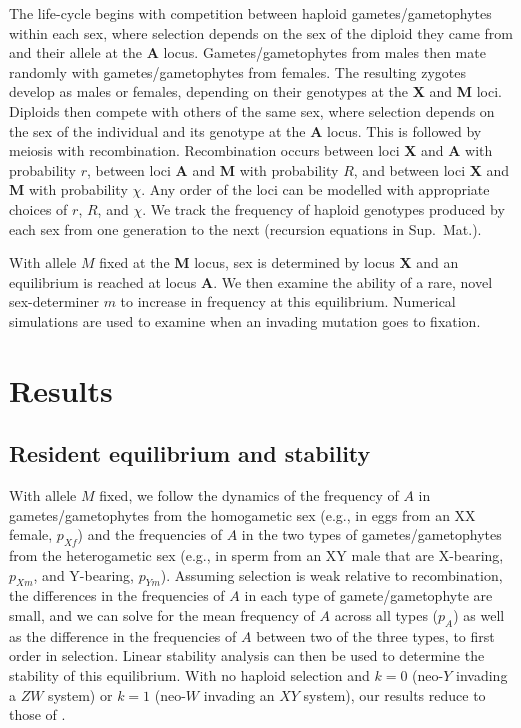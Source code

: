 \documentclass[12pt]{article}
\begin{document}
The life-cycle begins with competition between haploid gametes/gametophytes within each sex, where selection depends on the sex of the diploid they came from and their allele at the \textbf{A} locus.
Gametes/gametophytes from males then mate randomly with gametes/gametophytes from females.
The resulting zygotes develop as males or females, depending on their genotypes at the \textbf{X} and \textbf{M} loci.
Diploids then compete with others of the same sex, where selection depends on the sex of the individual and its genotype at the \textbf{A} locus.
This is followed by meiosis with recombination. 
Recombination occurs between loci \textbf{X} and \textbf{A} with probability $r$, between loci \textbf{A} and \textbf{M} with probability $R$, and between loci \textbf{X} and \textbf{M} with probability $\chi$. %
Any order of the loci can be modelled with appropriate choices of $r$, $R$, and $\chi$.
We track the frequency of haploid genotypes produced by each sex from one generation to the next (recursion equations in Sup.\ Mat.).

With allele $M$ fixed at the \textbf{M} locus, sex is determined by locus \textbf{X} and an equilibrium is reached at locus \textbf{A}. %
We then examine the ability of a rare, novel sex-determiner $m$ to increase in frequency at this equilibrium.
Numerical simulations are used to examine when an invading mutation goes to fixation.

\section*{Results}

\subsection*{Resident equilibrium and stability}
With allele $M$ fixed, we follow the dynamics of the frequency of $A$ in gametes/gametophytes from the homogametic sex (e.g., in eggs from an XX female, $p_{Xf}$) and the frequencies of $A$ in the two types of gametes/gametophytes from the heterogametic sex (e.g., in sperm from an XY male that are X-bearing, $p_{Xm}$, and Y-bearing, $p_{Ym}$).
Assuming selection is weak relative to recombination, the differences in the frequencies of $A$ in each type of gamete/gametophyte are small, and we can solve for the mean frequency of $A$ across all types ($p_A$) as well as the difference in the frequencies of $A$ between two of the three types, to first order in selection.
Linear stability analysis can then be used to determine the stability of this equilibrium.
With no haploid selection and $k=0$ (neo-$Y$ invading a $ZW$ system) or $k=1$ (neo-$W$ invading an $XY$ system), our results reduce to those of \cite{vanDoorn:2010hu}.
\end{document}
